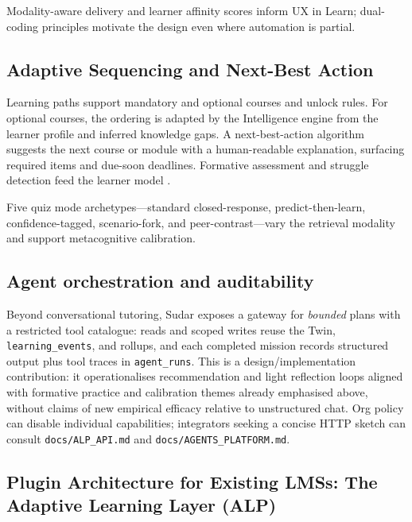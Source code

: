 \documentclass[10pt,twocolumn]{article}
\begin{document}
Modality-aware delivery and learner affinity scores inform UX in Learn;
dual-coding principles \cite{mayer2009,clark2016} motivate the design
even where automation is partial.

\subsection{Adaptive Sequencing and Next-Best Action}
\label{sec:adaptive}

Learning paths support mandatory and optional courses and unlock rules.
For optional courses, the ordering is adapted by the Intelligence
engine from the learner profile and inferred knowledge gaps. A
next-best-action algorithm suggests the next course or module with a
human-readable explanation, surfacing required items and due-soon
deadlines. Formative assessment and struggle detection feed the learner
model \cite{black1998,roediger2006}.

Five quiz mode archetypes---standard closed-response, predict-then-learn,
confidence-tagged, scenario-fork, and peer-contrast---vary the
retrieval modality and support metacognitive calibration.

\subsection{Agent orchestration and auditability}
\label{sec:sudaragents}

Beyond conversational tutoring, Sudar exposes a gateway for \emph{bounded}
plans with a restricted tool catalogue: reads and scoped writes reuse the
Twin, \texttt{learning\_events}, and rollups, and each completed mission
records structured output plus tool traces in \texttt{agent\_runs}.
This is a design/implementation contribution: it operationalises
recommendation and light reflection loops aligned with formative practice
and calibration themes already emphasised above, without claims of new
empirical efficacy relative to unstructured chat. Org policy can disable
individual capabilities; integrators seeking a concise HTTP sketch can consult
\texttt{docs/ALP\_API.md} and \texttt{docs/AGENTS\_PLATFORM.md}.

\subsection{Plugin Architecture for Existing LMSs: The Adaptive
Learning Layer (ALP)}
\label{sec:alp}
\end{document}
